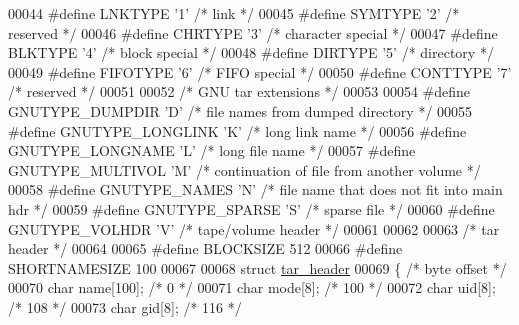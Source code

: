 \begin{DoxyCode}
00044 \textcolor{preprocessor}{#define LNKTYPE  '1'            }\textcolor{comment}{/* link */}\textcolor{preprocessor}{}
00045 \textcolor{preprocessor}{#define SYMTYPE  '2'            }\textcolor{comment}{/* reserved */}\textcolor{preprocessor}{}
00046 \textcolor{preprocessor}{#define CHRTYPE  '3'            }\textcolor{comment}{/* character special */}\textcolor{preprocessor}{}
00047 \textcolor{preprocessor}{#define BLKTYPE  '4'            }\textcolor{comment}{/* block special */}\textcolor{preprocessor}{}
00048 \textcolor{preprocessor}{#define DIRTYPE  '5'            }\textcolor{comment}{/* directory */}\textcolor{preprocessor}{}
00049 \textcolor{preprocessor}{#define FIFOTYPE '6'            }\textcolor{comment}{/* FIFO special */}\textcolor{preprocessor}{}
00050 \textcolor{preprocessor}{#define CONTTYPE '7'            }\textcolor{comment}{/* reserved */}\textcolor{preprocessor}{}
00051 
00052 \textcolor{comment}{/* GNU tar extensions */}
00053 
00054 \textcolor{preprocessor}{#define GNUTYPE\_DUMPDIR  'D'    }\textcolor{comment}{/* file names from dumped directory */}\textcolor{preprocessor}{}
00055 \textcolor{preprocessor}{#define GNUTYPE\_LONGLINK 'K'    }\textcolor{comment}{/* long link name */}\textcolor{preprocessor}{}
00056 \textcolor{preprocessor}{#define GNUTYPE\_LONGNAME 'L'    }\textcolor{comment}{/* long file name */}\textcolor{preprocessor}{}
00057 \textcolor{preprocessor}{#define GNUTYPE\_MULTIVOL 'M'    }\textcolor{comment}{/* continuation of file from another volume */}\textcolor{preprocessor}{}
00058 \textcolor{preprocessor}{#define GNUTYPE\_NAMES    'N'    }\textcolor{comment}{/* file name that does not fit into main hdr */}\textcolor{preprocessor}{}
00059 \textcolor{preprocessor}{#define GNUTYPE\_SPARSE   'S'    }\textcolor{comment}{/* sparse file */}\textcolor{preprocessor}{}
00060 \textcolor{preprocessor}{#define GNUTYPE\_VOLHDR   'V'    }\textcolor{comment}{/* tape/volume header */}\textcolor{preprocessor}{}
00061 
00062 
00063 \textcolor{comment}{/* tar header */}
00064 
00065 \textcolor{preprocessor}{#define BLOCKSIZE     512}
00066 \textcolor{preprocessor}{#define SHORTNAMESIZE 100}
00067 
00068 \textcolor{keyword}{struct }\hyperlink{structtar__header}{tar\_header}
00069 \{                               \textcolor{comment}{/* byte offset */}
00070   \textcolor{keywordtype}{char} name[100];               \textcolor{comment}{/*   0 */}
00071   \textcolor{keywordtype}{char} mode[8];                 \textcolor{comment}{/* 100 */}
00072   \textcolor{keywordtype}{char} uid[8];                  \textcolor{comment}{/* 108 */}
00073   \textcolor{keywordtype}{char} gid[8];                  \textcolor{comment}{/* 116 */}

\end{DoxyCode}
